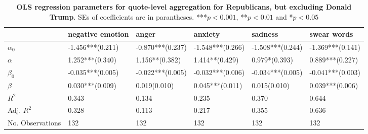 \begin{table}[h]\centering
\caption{\textbf{OLS regression parameters for quote-level aggregation for Republicans, but excluding Donald Trump}. SEs of coefficients are in parantheses. ***$p < 0.001$, **$p < 0.01$ and *$p < 0.05$}
	\label{fig: Party_3}
\begin{adjustbox}{width=\linewidth, center}
	\begin{tabular}{llllll}
	\toprule
	{} &            negative emotion &                                                     anger &                               anxiety &                                                   sadness &                 swear words \\
	\midrule
	$\alpha_0$       &            -1.456***(0.211) &                                          -0.870***(0.237) &                      -1.548***(0.266) &                                          -1.508***(0.244) &            -1.369***(0.141) \\
	$\alpha$         &  \phantom{-}1.252***(0.340) &                      \phantom{-}1.156**\phantom{*}(0.382) &  \phantom{-}1.414**\phantom{*}(0.429) &            \phantom{-}0.979*\phantom{*}\phantom{*}(0.393) &  \phantom{-}0.889***(0.227) \\
	$\beta_0$        &            -0.035***(0.005) &                                          -0.022***(0.005) &                      -0.032***(0.006) &                                          -0.034***(0.005) &            -0.041***(0.003) \\
	$\beta$          &  \phantom{-}0.030***(0.009) &  \phantom{-}0.019\phantom{*}\phantom{*}\phantom{*}(0.010) &            \phantom{-}0.045***(0.011) &  \phantom{-}0.015\phantom{*}\phantom{*}\phantom{*}(0.010) &  \phantom{-}0.039***(0.006) \\
	$R^2$            &                       0.343 &                                                     0.134 &                                 0.235 &                                                     0.370 &                       0.644 \\
	Adj. $R^2$       &                       0.328 &                                                     0.113 &                                 0.217 &                                                     0.355 &                       0.636 \\
	No. Observations &                         132 &                                                       132 &                                   132 &                                                       132 &                         132 \\
	\bottomrule
	\end{tabular}
	
\end{adjustbox}
	\end{table}

